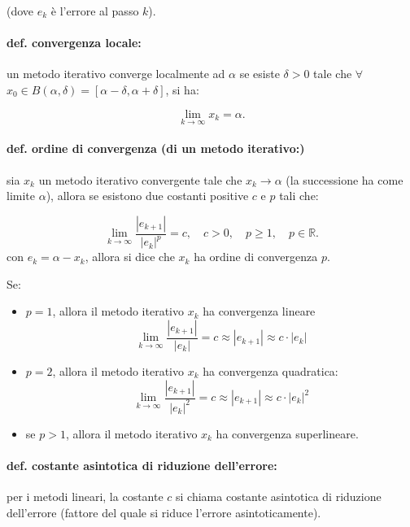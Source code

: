 \documentclass[a4paper, 11pt]{article}
\begin{document}
        (dove \( e_k \) è l'errore al passo \( k \)).

        \paragraph{def. convergenza locale:} un metodo iterativo converge localmente ad \( \alpha \) se esiste \( \delta > 0 \) tale che $ \forall  $ \( x_0 \in B(\alpha, \delta) = [\alpha - \delta, \alpha + \delta] \), si ha:

        \[
            \lim_{k \to \infty} x_k = \alpha.
        \]

        \paragraph{def. ordine di convergenza (di un metodo iterativo:)}sia $x_k$ un metodo iterativo convergente tale che \( x_k \to \alpha \) (la successione ha come limite \( \alpha \)), allora se esistono due costanti positive \( c \) e $p$ tali che:

        \[
            \lim_{k \to \infty} \frac{|e_{k+1}|}{|e_k|^p} = c, \quad c > 0, \quad p \geq 1, \quad p \in \mathbb{R}.
        \] 
        con $e_k = \alpha - x_k$, allora si dice che $x_k$ ha ordine di convergenza \( p \). 
        
        Se:        
        \begin{itemize}
            \item \( p = 1 \), allora il metodo iterativo $x_k$ ha convergenza lineare
            \[
                \lim_{k \to \infty} \frac{|e_{k+1}|}{|e_k|} = c \approx |e_{k+1}| \approx c \cdot |e_k|
            \]
            \item \( p = 2 \), allora il metodo iterativo $x_k$ ha convergenza quadratica:
            \[
                \lim_{k \to \infty} \frac{|e_{k+1}|}{|e_k|^2} = c \approx |e_{k+1}| \approx c \cdot |e_k|^2
            \]
            \item se \( p > 1 \), allora il metodo iterativo  $x_k$ ha convergenza superlineare.
        \end{itemize}

        \paragraph{def. costante asintotica di riduzione dell'errore:} per i metodi lineari, la costante \( c \) si chiama costante asintotica di riduzione dell'errore (fattore del quale si riduce l'errore asintoticamente).
        
\end{document}

